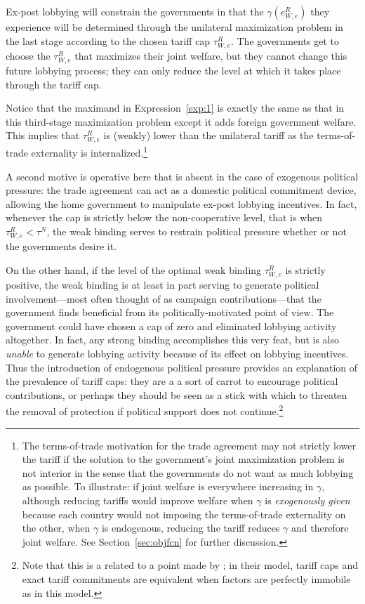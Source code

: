 \documentclass[12pt]{article}
\newcommand{\ga}{\gamma}
\begin{document}
Ex-post lobbying will constrain the governments in that the $\ga\left(e^R_{W,e}\right)$ they experience will be determined through the unilateral maximization problem in the last stage according to the chosen tariff cap $\tau^R_{W,e}$. The governments get to choose the $\tau^R_{W,e}$ that maximizes their joint welfare, but they cannot change this future lobbying process; they can only reduce the level at which it takes place through the tariff cap.

Notice that the maximand in Expression~\ref{exp:1} is exactly the same as that in this third-stage maximization problem except it adds  foreign government welfare. This implies that $\tau^R_{W,e}$ is (weakly) lower than the unilateral tariff as the terms-of-trade externality is internalized.\footnote{The terms-of-trade motivation for the trade agreement may not strictly lower the tariff if the solution to the government's joint maximization problem is not interior in the sense that the governments do not want as much lobbying as possible. To illustrate: if joint welfare is everywhere increasing in $\ga$, although reducing tariffs would improve welfare when $\ga$ is \textit{exogenously given} because each country would not imposing the terms-of-trade externality on the other, when $\ga$ is endogenous, reducing the tariff reduces $\ga$ and therefore joint welfare. See Section~\ref{sec:objfcn} for further discussion.}

A second motive is operative here that is absent in the case of exogenous political pressure: the trade agreement can act as a domestic political commitment device, allowing the home government to manipulate ex-post lobbying incentives. In fact, whenever the cap is strictly below the non-cooperative level, that is when $\tau^R_{W,e} < \tau^N$, the weak binding serves to restrain political pressure whether or not the governments desire it.

On the other hand, if the level of the optimal weak binding $\tau^R_{W,e}$ is strictly positive, the weak binding is at least in part serving to generate political involvement---most often thought of as campaign contributions---that the government finds beneficial from its politically-motivated point of view. The government could have chosen a cap of zero and eliminated lobbying activity altogether. In fact, any strong binding accomplishes this very feat, but is also \textit{unable} to generate lobbying activity because of its effect on lobbying incentives. Thus the introduction of endogenous political pressure provides an explanation of the prevalence of tariff caps: they are a a sort of carrot to encourage political contributions, or perhaps they should be seen as a stick with which to threaten the removal of protection if political support does not continue.\footnote{Note that this is a related to a point made by \Textcite{mrc2007}; in their model, tariff caps and exact tariff commitments are equivalent when factors are perfectly immobile as in this model.}
\end{document}
